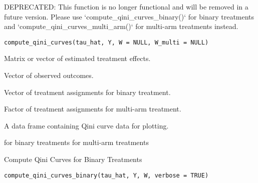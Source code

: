 \documentclass[a4paper]{book}
\begin{document}
%
\begin{Description}
DEPRECATED: This function is no longer functional and will be removed in a future version.
Please use `compute\_qini\_curves\_binary()` for binary treatments and
`compute\_qini\_curves\_multi\_arm()` for multi-arm treatments instead.
\end{Description}
%
\begin{Usage}
\begin{verbatim}
compute_qini_curves(tau_hat, Y, W = NULL, W_multi = NULL)
\end{verbatim}
\end{Usage}
%
\begin{Arguments}
\begin{ldescription}
\item[\code{tau\_hat}] Matrix or vector of estimated treatment effects.

\item[\code{Y}] Vector of observed outcomes.

\item[\code{W}] Vector of treatment assignments for binary treatment.

\item[\code{W\_multi}] Factor of treatment assignments for multi-arm treatment.
\end{ldescription}
\end{Arguments}
%
\begin{Value}
A data frame containing Qini curve data for plotting.
\end{Value}
%
\begin{SeeAlso}
 for binary treatments
 for multi-arm treatments
\end{SeeAlso}
%
\begin{Description}
Compute Qini Curves for Binary Treatments
\end{Description}
%
\begin{Usage}
\begin{verbatim}
compute_qini_curves_binary(tau_hat, Y, W, verbose = TRUE)
\end{verbatim}
\end{Usage}
\end{document}
